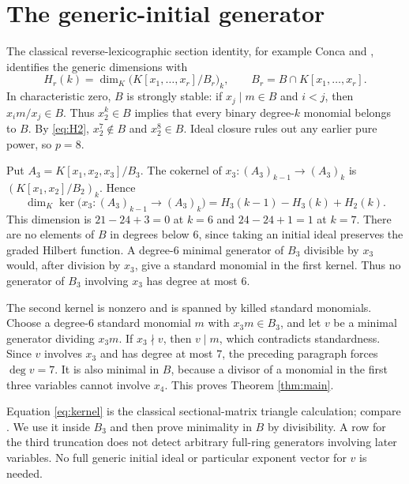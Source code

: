 \documentclass[11pt]{article}
\begin{document}
\section{The generic-initial generator}
The classical reverse-lexicographic section identity, for example
Conca \cite[Lemma 1.2]{Conca} and \cite[Theorem 6.2]{BPT}, identifies
the generic dimensions with
\begin{equation}\label{eq:section}
 H_r(k)=\dim_K\bigl(K[x_1,\ldots,x_r]/B_r\bigr)_k,
 \qquad B_r=B\cap K[x_1,\ldots,x_r].
\end{equation}
In characteristic zero, $B$ is strongly stable: if $x_j\mid m\in B$ and
$i<j$, then $x_im/x_j\in B$. Thus $x_2^k\in B$ implies that every binary
degree-$k$ monomial belongs to $B$. By \eqref{eq:H2}, $x_2^7\notin B$
and $x_2^8\in B$. Ideal closure rules out any earlier pure power, so $p=8$.

Put $A_3=K[x_1,x_2,x_3]/B_3$. The cokernel of
$x_3:(A_3)_{k-1}\to(A_3)_k$ is $(K[x_1,x_2]/B_2)_k$. Hence
\begin{equation}\label{eq:kernel}
 \dim_K\ker\bigl(x_3:(A_3)_{k-1}\to(A_3)_k\bigr)
 =H_3(k-1)-H_3(k)+H_2(k).
\end{equation}
This dimension is $21-24+3=0$ at $k=6$ and $24-24+1=1$ at $k=7$.
There are no elements of $B$ in degrees below $6$, since taking an initial
ideal preserves the graded Hilbert function. A degree-$6$ minimal generator
of $B_3$ divisible by $x_3$ would, after division by $x_3$, give a standard
monomial in the first kernel. Thus no generator of $B_3$ involving $x_3$
has degree at most $6$.

The second kernel is nonzero and is spanned by killed standard monomials.
Choose a degree-$6$ standard monomial $m$ with $x_3m\in B_3$, and let
$v$ be a minimal generator dividing $x_3m$. If $x_3\nmid v$, then $v\mid m$,
which contradicts standardness. Since $v$ involves $x_3$ and has degree at
most $7$, the preceding paragraph forces $\deg v=7$. It is also minimal in
$B$, because a divisor of a monomial in the first three variables cannot
involve $x_4$. This proves Theorem \ref{thm:main}.

Equation \eqref{eq:kernel} is the classical sectional-matrix triangle
calculation; compare \cite[Theorem 6.6]{BPT}. We use it inside $B_3$ and
then prove minimality in $B$ by divisibility. A row for the third truncation
does not detect arbitrary full-ring generators involving later variables.
No full generic initial ideal or particular exponent vector for $v$ is
needed.
\end{document}
